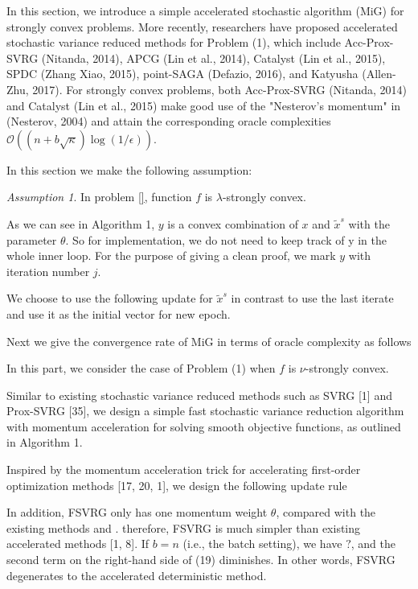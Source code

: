 \documentclass{article}
\theoremstyle{definition}
\theoremstyle{remark}
\newtheorem{assumption}[theorem]{Assumption}
\begin{document}
{\color{DarkOrchid}
In this section, we introduce a simple accelerated stochastic algorithm (MiG) for strongly convex 
problems.
More recently, researchers have proposed accelerated stochastic variance reduced methods for Problem (1), which include Acc-Prox-SVRG (Nitanda, 2014), APCG (Lin et al., 2014), Catalyst (Lin et al., 2015), SPDC (Zhang  Xiao, 2015), point-SAGA (Defazio, 2016), and Katyusha (Allen-Zhu, 2017). For strongly convex problems, both Acc-Prox-SVRG (Nitanda, 2014) and Catalyst (Lin et al., 2015) make good use of the "Nesterov’s momentum" in (Nesterov, 2004) and attain the corresponding oracle complexities $\mathcal{O}((n+b\sqrt{\kappa})\log (1/\epsilon))$. 

In this section we make the following assumption:
\begin{assumption}
In problem \eqref{}, function $f$ is $\lambda$-strongly convex.
\end{assumption}

As we can see in Algorithm 1, $y$ is a
convex combination of $x$ and $\widetilde{x}^s$ with the parameter $\theta$. So for implementation, we do not need to keep track
of y in the whole inner loop. For the purpose of giving a clean proof, we mark $y$ with iteration number $j$.

We choose to use the following update for $\widetilde{x}^s$ in contrast to use the last iterate and use it as the initial
vector for new epoch.

Next we give the convergence rate of MiG in terms of oracle complexity as follows

In this part, we consider the case of Problem (1) when $f$ is $\nu$-strongly convex.

Similar to existing stochastic variance reduced methods such as SVRG [1] and Prox-SVRG [35], we design a simple fast stochastic variance reduction algorithm with momentum acceleration for solving smooth objective functions, as outlined
in Algorithm 1.

Inspired by the momentum acceleration trick for accelerating first-order optimization methods [17, 20, 1], we design the following update rule

In addition, FSVRG only has one momentum weight $\theta$, compared with the existing methods and . therefore, FSVRG is much simpler than existing accelerated methods [1, 8]. If $b = n$ (i.e., the
batch setting), we have $?$, and the second term on the right-hand side of (19) diminishes. In other words, FSVRG degenerates to the accelerated deterministic method.
}
\end{document}
